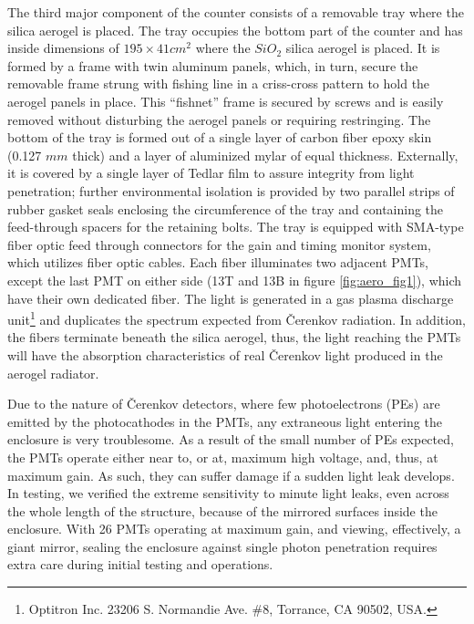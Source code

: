The third major component of the counter consists of a removable tray where the
silica aerogel is placed. 
The tray occupies the bottom part of the counter and has inside dimensions of 
$195\times 41 cm^2$ where the $SiO_2$ silica aerogel is placed. 
It is formed by a frame with twin aluminum panels, which, in turn, secure 
the removable frame strung with fishing line in a criss-cross pattern to hold 
the aerogel panels in place.  This ``fishnet'' frame is secured by
screws and is easily removed without disturbing the aerogel panels or requiring
restringing.  The bottom of the tray is formed out of a single layer of carbon
fiber epoxy skin (0.127 $mm$ thick) and a layer of aluminized mylar of equal
thickness.  Externally, it is covered by a single layer of Tedlar film to
assure integrity from light penetration; further environmental isolation is
provided by two parallel strips of rubber gasket seals enclosing the
circumference of the tray and containing the feed-through spacers for the
retaining bolts.   The tray is equipped with SMA-type fiber optic feed through
connectors for the gain and timing monitor system, which utilizes fiber
optic cables.  Each fiber illuminates two adjacent PMTs, except the last PMT
on either side (13T and 13B in figure \ref{fig:aero_fig1}), 
which have their own dedicated fiber. 
The light is generated in a gas plasma discharge 
unit\footnote{Optitron Inc. 23206 S. Normandie Ave. \#8, Torrance, CA 90502, USA.} 
and duplicates the spectrum expected from \v{C}erenkov radiation.  In addition, the
fibers terminate beneath the silica aerogel, thus, the light reaching the PMTs
will have the absorption characteristics of real \v{C}erenkov light produced 
in the aerogel radiator. 

Due to the nature of \v{C}erenkov detectors, where few photoelectrons (PEs) are
emitted by the photocathodes in the PMTs, any extraneous light entering the
enclosure is very troublesome.  As a result of the small number of PEs
expected, the PMTs operate either near to, or at, maximum high voltage, and,
thus, at maximum gain.  
As such, they can suffer damage if a sudden light leak develops.  
In testing, we verified the extreme sensitivity to minute light leaks, 
even across the whole length of the structure, because of the mirrored
surfaces inside the enclosure.  
With 26 PMTs operating at maximum gain, and viewing, effectively, a giant mirror, 
sealing the enclosure against single photon penetration requires extra care during 
initial testing and operations.

